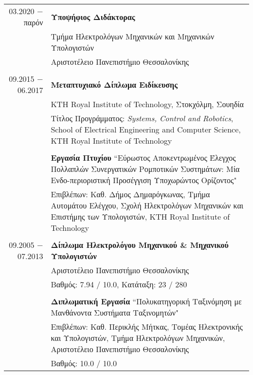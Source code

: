 \documentclass[a4paper,10pt,twoside]{article}
\begin{document}
\begin{tabular}{rp{11cm}}
03.2020 $-$ παρόν   & \textbf{Υποψήφιος Διδάκτορας} \\
                    & Τμήμα Ηλεκτρολόγων Μηχανικών και Μηχανικών Υπολογιστών \\
                    & Αριστοτέλειο Πανεπιστήμιο Θεσσαλονίκης \\
&\\
09.2015 $-$ 06.2017 & \textbf{Μεταπτυχιακό Δίπλωμα Ειδίκευσης} \\
                    & KTH Royal Institute of Technology, Στοκχόλμη, Σουηδία\\
                    & Τίτλος Προγράμματος: \textit{Systems, Control and Robotics},
                      School of Electrical Engineering and Computer Science, KTH Royal Institute of Technology\\

&\\                 & \textbf{Εργασία Πτυχίου} ``Εύρωστος Αποκεντρωμένος Έλεγχος Πολλαπλών Συνεργατικών Ρομποτικών Συστημάτων: Μία Ενδο-περιοριστική
                      Προσέγγιση Υποχωρώντος Ορίζοντος" \\
                    & Επιβλέπων: Καθ. Δήμος Δημαρόγκωνας, Τμήμα Αυτομάτου Ελέγχου, Σχολή Ηλεκτρολόγων Μηχανικών και Επιστήμης των Υπολογιστών,
                      KTH Royal Institute of Technology\\
&\\
09.2005 $-$ 07.2013 & \textbf{Δίπλωμα Ηλεκτρολόγου Μηχανικού \& Μηχανικού Υπολογιστών} \\
                    & Αριστοτέλειο Πανεπιστήμιο Θεσσαλονίκης \\
                    & Βαθμός: 7.94 / 10.0, Κατάταξη: 23 / 280 \\
&\\
                    & \textbf{Διπλωματική Εργασία} ``Πολυκατηγορική Ταξινόμηση με Μανθάνοντα Συστήματα Ταξινομητών"\\
                    & Επιβλέπων: Καθ. Περικλής Μήτκας, Τομέας Ηλεκτρονικής και Υπολογιστών, Τμήμα Ηλεκτρολόγων Μηχανικών,
                      Αριστοτέλειο Πανεπιστήμιο Θεσσαλονίκης\\
                    & Βαθμός: 10.0 / 10.0
\end{tabular}\\


\end{document}
